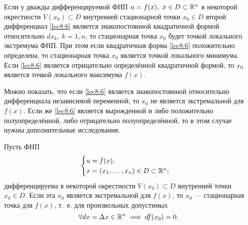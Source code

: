 \documentclass[../main.tex]{subfiles}
\begin{document}
\begin{thm}
        Если у дважды дифференцируемой ФНП $u=f(x),\ x \in D \subset \mathbb{R}^n$
        в некоторой окрестности $V(x_0) \subset D$ внутренней стационарной
        точки $x_0 \in D$ второй дифференциал \eqref{lec8:6} является
        знакопостоянной квадратичной формой относительно $dx_k,\ k =
        \overline{1, n}$, то стационарная точка $x_0$ будет точкой локального
        экстремума ФНП. При этом если квадратичная форма \eqref{lec8:6}
        положительно определена, то стационарная точка $x_0$ является точкой
        локального минимума. Если \eqref{lec8:6} является отрицательно
        определённой квадратичной формой, то $x_0$ является точкой локального
        максимума $f(x)$.
    \end{thm}
\begin{rem}
        Можно показать, что если \eqref{lec8:6} является знакопостоянной
        относительно дифференциала независимой переменной, то $x_0$ не
        является экстремальной для $f(x)$. Если же \eqref{lec8:6} является
        вырожденной и либо положительно полуопределённой, либо отрицательно
        полуопределённой, то в этом случае нужны дополнительные исследования.
    \end{rem}
\begin{thm}
		Пусть ФНП
		\[
		\begin{cases}
			u = f (x), \\
			x = (x_1, \ldots, x_n) \in D \subset \mathbb{R}^n; \\
		\end{cases}
		\]
		дифференцируема в некоторой окрестности $V (x_0) \subset D$
		внутренней точки $x_0 \in D$. Если эта $x_0$ является экстремальной
		для $f (x)$, то $x_0$ --- стационарная точка
		для $f (x)$, т.~е. для произвольных допустимых
		\begin{equation}
		\label{nec cond loc extr}
			\forall dx = \Delta x \in \mathbb{R}^n \implies df (x_0) = 0.
		\end{equation}
	\end{thm}
\end{document}
